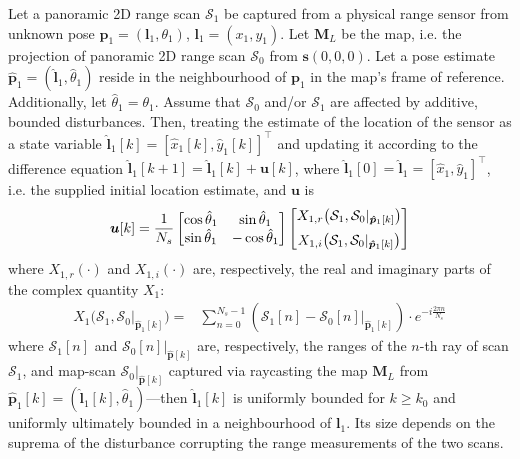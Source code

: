 \begin{theorem}
  \label{prop:theorem_without_disturbance}
  Let a panoramic 2D range scan $\mathcal{S}_1$ be captured from a physical
  range sensor from unknown pose $\bm{p}_1 = (\bm{l}_1,\theta_1)$, $\bm{l}_1 = (x_1,y_1)$.
  Let $\bm{M}_L$ be the map, i.e. the projection of panoramic 2D range scan
  $\mathcal{S}_0$ from $\bm{s}(0,0,0)$. Let a
  pose estimate $\hat{\bm{p}}_1 = (\hat{\bm{l}}_1, \hat{\theta}_1)$ reside in the
  neighbourhood of $\bm{p}_1$ in the map's frame of reference. Additionally, let
  $\hat{\theta}_1 = \theta_1$. Assume that $\mathcal{S}_0$ and/or $\mathcal{S}_1$
  are affected by additive, bounded disturbances. Then,
  treating the estimate of the location of the sensor as a state variable
  $\hat{\bm{l}}_1[k] = [\hat{x}_1[k], \hat{y}_1[k]]^\top$ and updating it according
  to the difference equation $\hat{\bm{l}}_1[k+1] = \hat{\bm{l}}_1[k] + \bm{u}[k]$,
  where $\hat{\bm{l}}_1[0] = \hat{\bm{l}}_1 = [\hat{x}_1, \hat{y}_1]^{\top}$,
  i.e. the supplied initial location estimate, and $\bm{u}$ is
  \begin{align}
    \bm{u}[k] = \dfrac{1}{N_s}
    \begin{bmatrix}
      \cos\hat{\theta}_1 & \sin\hat{\theta}_1 \\
      \sin\hat{\theta}_1 & - \cos\hat{\theta}_1
    \end{bmatrix}
    \begin{bmatrix}
      X_{1,r}\big(\mathcal{S}_1, \mathcal{S}_0|_{\bm{\hat{p}}_1[k]}\big) \vspace{0.2cm} \\
      X_{1,i}\big(\mathcal{S}_1, \mathcal{S}_0|_{\bm{\hat{p}}_1[k]}\big)
    \end{bmatrix}
    \label{eq:control_vector_without_disturbance}
  \end{align}
  where $X_{1,r}(\cdot)$ and $X_{1,i}(\cdot)$ are, respectively, the real and
  imaginary parts of the complex quantity $X_1$:
  \begin{align}
    X_1\big(\mathcal{S}_1, \mathcal{S}_0|_{\bm{\hat{p}}_1[k]}\big)
      = &\sum\limits_{n=0}^{N_s-1}(\mathcal{S}_1[n] - \mathcal{S}_0[n]|_{\bm{\hat{p}}_1[k]}) \cdot e^{-i \frac{2 \pi n}{N_s}} \label{eq:X1}
  \end{align}
  where $\mathcal{S}_1[n]$ and $\mathcal{S}_0[n]|_{\bm{\hat{p}}[k]}$ are,
  respectively, the ranges of the $n$-th ray of scan $\mathcal{S}_1$, and
  map-scan $\mathcal{S}_0|_{\bm{\hat{p}}[k]}$ captured via raycasting the map
  $\bm{M}_L$ from $\bm{\hat{p}}_1[k] = (\hat{\bm{l}}_1[k],
  \hat{\theta}_1)$---then $\hat{\bm{l}}_1[k]$ is uniformly bounded for $k \geq
  k_0$ and uniformly ultimately bounded in a neighbourhood of $\bm{l}_1$. Its
  size depends on the suprema of the disturbance corrupting the range
  measurements of the two scans.
\end{theorem}


